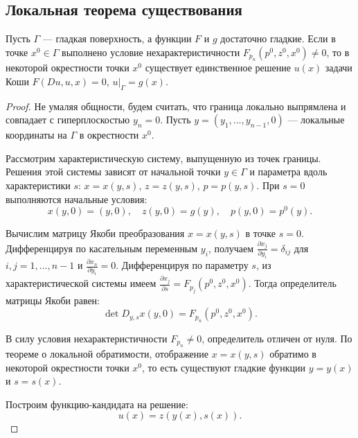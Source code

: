 \subsection{Локальная теорема существования}

\begin{theorem}
    Пусть $\Gamma$ --- гладкая поверхность, а функции $F$ и $g$
    достаточно гладкие. Если в точке $x^0 \in \Gamma$ выполнено
    условие нехарактеристичности $F_{p_n}(p^0, z^0, x^0) \neq 0$,
    то в некоторой окрестности точки $x^0$ существует единственное
    решение $u(x)$ задачи Коши $F(Du, u, x) = 0$, $u\big|_{\Gamma} = g(x)$.
\end{theorem}

\begin{proof}
    Не умаляя общности, будем считать, что граница локально выпрямлена и
    совпадает с гиперплоскостью $y_n = 0$. Пусть 
    $y = (y_1, \dots, y_{n-1}, 0)$ --- локальные координаты на $\Gamma$ в окрестности $x^0$.
    
    Рассмотрим характеристическую систему, выпущенную из точек границы.
    Решения этой системы зависят от начальной точки $y \in \Gamma$ и параметра вдоль характеристики $s$:
    $x = x(y, s)$, $z = z(y, s)$, $p = p(y, s)$.
    При $s = 0$ выполняются начальные условия:
    \begin{equation}
        x(y, 0) = (y, 0), \quad z(y, 0) = g(y), \quad p(y, 0) = p^0(y).
    \end{equation}
    
    Вычислим матрицу Якоби преобразования $x = x(y, s)$ в точке $s = 0$.
    Дифференцируя по касательным переменным $y_i$, получаем
    $\frac{\partial x_j}{\partial y_i} = \delta_{ij}$ для
    $i, j = 1, \dots, n-1$ и $\frac{\partial x_n}{\partial y_i} = 0$.
    Дифференцируя по параметру $s$, из характеристической системы имеем
    $\frac{\partial x_j}{\partial s} = F_{p_j}(p^0, z^0, x^0)$.
    Тогда определитель матрицы Якоби равен:
    \begin{equation}
        \det D_{y, s} x(y, 0) = F_{p_n}(p^0, z^0, x^0).
    \end{equation}
    
    В силу условия нехарактеристичности $F_{p_n} \neq 0$, определитель отличен от нуля.
    По теореме о локальной обратимости, отображение $x = x(y, s)$
    обратимо в некоторой окрестности точки $x^0$, то есть существуют гладкие функции $y = y(x)$ и $s = s(x)$.
    
    Построим функцию-кандидата на решение:
    \begin{equation}
        u(x) = z(y(x), s(x)).
    \end{equation}
    

\end{proof}
